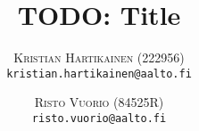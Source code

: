 \documentclass[twoside]{article}
\title{\vspace{-15mm}\fontsize{24pt}{10pt}\selectfont\textbf{TODO: Title}}
\author{
\large
\textsc{Kristian Hartikainen (222956)}\\[2mm]
\tt kristian.hartikainen@aalto.fi \\[2mm]
\and
\textsc{Risto Vuorio (84525R)}\\[2mm]
\tt risto.vuorio@aalto.fi \\[2mm]
\vspace{-5mm}
}
\date{}
\begin{document}
\maketitle %


\begin{abstract}

  

\end{abstract}

\end{document}
